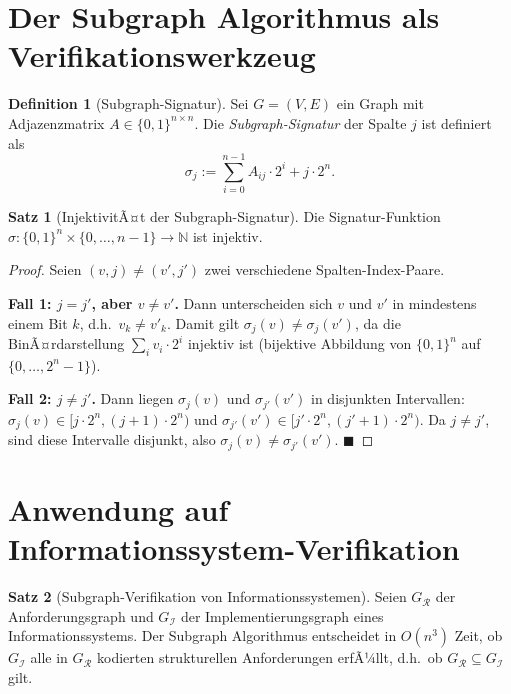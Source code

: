 ﻿\documentclass[a4paper,12pt]{report}
\theoremstyle{definition}
\newtheorem{definition}{Definition}[section]
\newtheorem{satz}{Satz}[section]
\begin{document}
\section{Der Subgraph Algorithmus als Verifikationswerkzeug}

\begin{definition}[Subgraph-Signatur]
\label{def:sigsub}
Sei $G = (V, E)$ ein Graph mit Adjazenzmatrix $A \in \{0,1\}^{n \times n}$.
Die \emph{Subgraph-Signatur} der Spalte $j$ ist definiert als
\[
  \sigma_j := \sum_{i=0}^{n-1} A_{ij} \cdot 2^i + j \cdot 2^n.
\]
\end{definition}

\begin{satz}[InjektivitÃ¤t der Subgraph-Signatur]
\label{satz:injektiv}
Die Signatur-Funktion $\sigma: \{0,1\}^n \times \{0,\ldots,n-1\} \to \mathbb{N}$
ist injektiv.
\end{satz}

\begin{proof}
Seien $(v, j) \neq (v', j')$ zwei verschiedene Spalten-Index-Paare.

\textbf{Fall 1: $j = j'$, aber $v \neq v'$.}
Dann unterscheiden sich $v$ und $v'$ in mindestens einem Bit $k$, d.h.\ $v_k \neq v'_k$.
Damit gilt $\sigma_j(v) \neq \sigma_j(v')$, da die BinÃ¤rdarstellung $\sum_i v_i \cdot 2^i$
injektiv ist (bijektive Abbildung von $\{0,1\}^n$ auf $\{0,\ldots,2^n-1\}$).

\textbf{Fall 2: $j \neq j'$.}
Dann liegen $\sigma_j(v)$ und $\sigma_{j'}(v')$ in disjunkten Intervallen:
$\sigma_j(v) \in [j \cdot 2^n, (j+1) \cdot 2^n)$ und
$\sigma_{j'}(v') \in [j' \cdot 2^n, (j'+1) \cdot 2^n)$.
Da $j \neq j'$, sind diese Intervalle disjunkt, also $\sigma_j(v) \neq \sigma_{j'}(v')$. $\blacksquare$
\end{proof}

\section{Anwendung auf Informationssystem-Verifikation}

\begin{satz}[Subgraph-Verifikation von Informationssystemen]
\label{satz:subgraphverif}
Seien $G_\mathcal{R}$ der Anforderungsgraph und $G_\mathcal{I}$ der Implementierungsgraph
eines Informationssystems. Der Subgraph Algorithmus entscheidet in $O(n^3)$ Zeit, ob
$G_\mathcal{I}$ alle in $G_\mathcal{R}$ kodierten strukturellen Anforderungen erfÃ¼llt,
d.h.\ ob $G_\mathcal{R} \subseteq G_\mathcal{I}$ gilt.
\end{satz}
\end{document}
